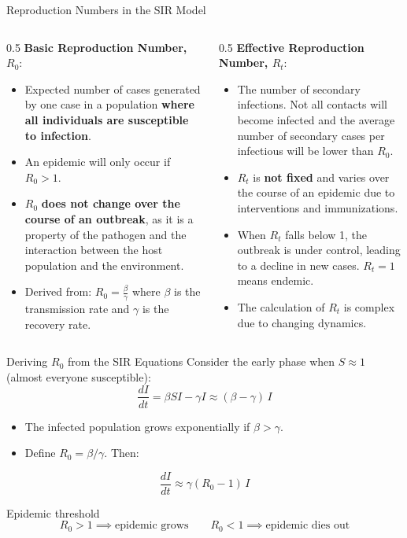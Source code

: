 \begin{frame}{Reproduction Numbers in the SIR Model}
\footnotesize
\begin{columns}
    \begin{column}{0.5\textwidth}
    \textbf{Basic Reproduction Number, \(R_0\)}:
\begin{itemize}
    \item Expected number of cases generated by one case in a population \textbf{where all individuals are susceptible to infection}.
    \item An epidemic will only occur if \(R_0 > 1\).
    \item \(R_0\) \textbf{does not change over the course of an outbreak}, as it is a property of the pathogen and the interaction between the host population and the environment.
    \item Derived from: \(R_0 = \frac{\beta}{\gamma}\) where \(\beta\) is the transmission rate and \(\gamma\) is the recovery rate.
\end{itemize}
    \end{column}

\pause
    \begin{column}{0.5\textwidth}
        \textbf{Effective Reproduction Number, \(R_t\)}:
\begin{itemize}
    \item The number of secondary infections. Not all contacts will become infected and the average number of secondary cases per infectious will be lower than \(R_0\).
    \item \(R_t\) is \textbf{not fixed} and varies over the course of an epidemic due to interventions and immunizations.
    \item When \(R_t\) falls below 1, the outbreak is under control, leading to a decline in new cases. $R_t = 1$ means endemic.
    \item The calculation of \(R_t\) is  complex  due to changing dynamics.
\end{itemize}
    \end{column}
\end{columns}
\end{frame}

\begin{frame}{Deriving $R_0$ from the SIR Equations}
\small
Consider the early phase when $S \approx 1$ (almost everyone susceptible):
  \[
    \frac{dI}{dt} = \beta S I - \gamma I \approx (\beta - \gamma)\, I
  \]
  \pause
  \begin{itemize}
    \item The infected population grows exponentially if $\beta > \gamma$.
    \item Define $R_0 = \beta / \gamma$. Then:
  \end{itemize}
  \[
    \frac{dI}{dt} \approx \gamma(R_0 - 1)\, I
  \]
  \vfill
  \begin{block}{Epidemic threshold}
    \[
      R_0 > 1 \implies \text{epidemic grows} \qquad R_0 < 1 \implies \text{epidemic dies out}
    \]
  \end{block}
\end{frame}

